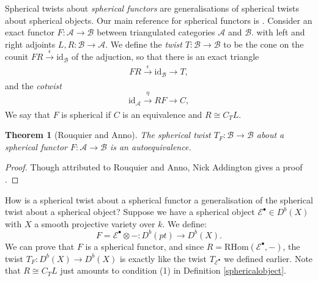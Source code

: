 \documentclass[oneside,reqno]{amsart}
\newtheorem{thm}{Theorem}[section]
\theoremstyle{definition}
\theoremstyle{definition}
\theoremstyle{definition}
\theoremstyle{definition}
\newcommand{\Es}{\mathcal{E}}
\begin{document}
\newline
Spherical twists about \textit{spherical functors} are generalisations of spherical twists about spherical objects. Our main reference for spherical functors is \cite[Section 1]{spherical}. Consider an exact functor $F : \mathcal{A} \to \mathcal{B}$ between triangulated categories $\mathcal{A}$ and $\mathcal{B}$. with left and right adjoints $L, R : \mathcal{B} \to \mathcal{A}$. We define the \textit{twist} $T : \mathcal{B} \to \mathcal{B}$ to be the cone on the counit $FR \xrightarrow[]{\epsilon} \text{id}_\mathcal{B}$ of the adjuction, so that there is an exact triangle 
\begin{equation}
     FR \xrightarrow[]{\epsilon} \text{id}_\mathcal{B}\xrightarrow{} T,
\end{equation}  
and the \textit{cotwist} 
\begin{equation}
    \text{id}_\mathcal{A} \xrightarrow[]{\eta}  RF \xrightarrow{} C,
\end{equation}  
We say that $F$ is spherical if $C$ is an
equivalence and $R \cong C_T L$. 
\begin{thm}[Rouquier and Anno]
    The spherical twist $T_F : \mathcal{B} \to \mathcal{B}$ about a spherical functor $F : \mathcal{A} \to \mathcal{B}$ is an autoequivalence.
\end{thm}
\begin{proof}
    Though attributed to Rouquier and Anno, Nick Addington gives a proof \cite[Theorem 1]{spherical}. 
\end{proof}
How is a spherical twist about a spherical functor a generalisation of the spherical twist about a spherical object? Suppose we have a spherical object $\Es^{\bullet} \in D^b(X)$ with $X$ a smooth projective variety over $k$. We define:
$$
F = \Es^{\bullet} \otimes - : D^b(pt) \xrightarrow{} D^b(X).
$$
We can prove that $F$ is a spherical functor, and since $R = \text{RHom}(\Es^{\bullet}, -)$, the twist $T_F : D^b(X) \to D^b(X)$ is exactly like the twist $T_{\Es^{\bullet}}$ we defined earlier. Note that $R \cong C_T L$ just amounts to condition (1) in Definition \ref{sphericalobject}.
\end{document}
